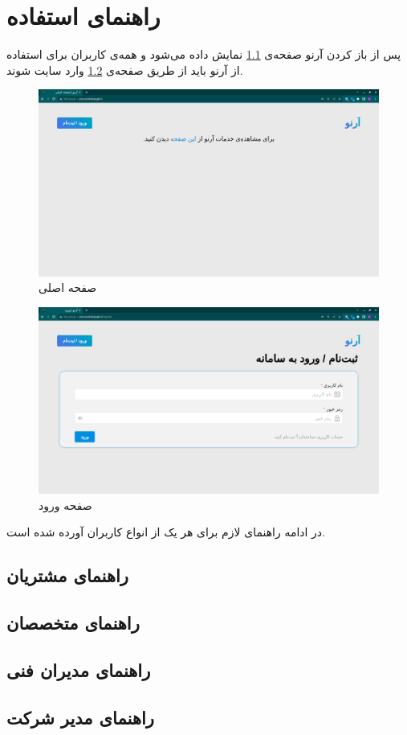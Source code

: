 \chapter{راهنمای استفاده}

پس از باز کردن آرنو صفحه‌ی \ref{home} نمایش داده می‌شود و همه‌ی کاربران برای استفاده از آرنو باید از طریق صفحه‌ی \ref{login} وارد سایت شوند. 

\begin{figure}[h]
	\centering
	\includegraphics[width=\textwidth]{figs/user-guide/home}
	\caption{صفحه اصلی}
	\label{home}
\end{figure}

\begin{figure}[h]
	\centering
	\includegraphics[width=\textwidth]{figs/user-guide/login}
	\caption{صفحه ورود}
	\label{login}
\end{figure}

در ادامه راهنمای لازم برای هر یک از انواع کاربران آورده ‌شده است.

\section{راهنمای مشتریان}


\section{راهنمای متخصصان}


\section{راهنمای مدیران فنی}


\section{راهنمای مدیر شرکت}
